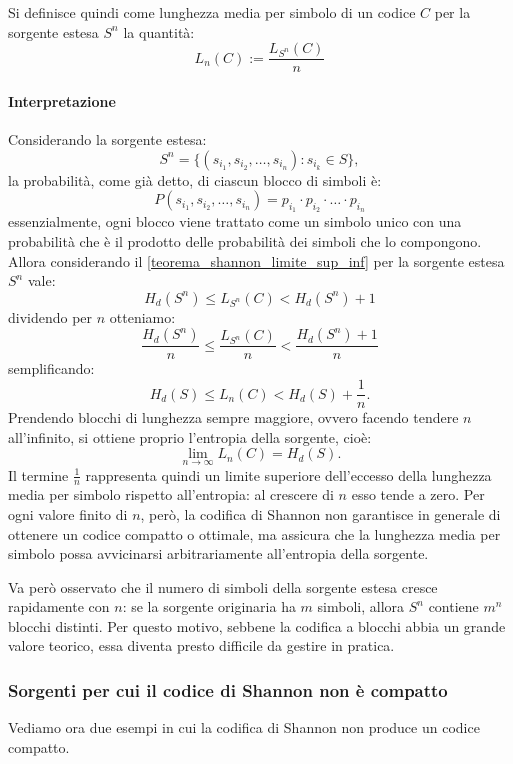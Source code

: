 \documentclass{article}
\theoremstyle{definition}
\numberwithin{equation}{section}
\begin{document}
Si definisce quindi come lunghezza media per simbolo di un codice $C$ per la sorgente estesa $S^n$ la quantità:
\[
    L_n(C) := \frac{L_{S^n}(C)}{n}
\]

\paragraph{Interpretazione}
Considerando la sorgente estesa:
\[
    S^n = \{(s_{i_1}, s_{i_2},\ldots, s_{i_n}) : s_{i_k} \in S\},
\]
la probabilità, come già detto, di ciascun blocco di simboli è:
\[
    P(s_{i_1}, s_{i_2},\ldots, s_{i_n}) = p_{i_1} \cdot p_{i_2} \cdot \ldots \cdot p_{i_n}
\]
essenzialmente, ogni blocco viene trattato come un simbolo unico con una probabilità che è il prodotto delle probabilità dei simboli che lo compongono. Allora considerando il \autoref{teorema_shannon_limite_sup_inf} per la sorgente estesa $S^n$ vale:
\[
    H_d(S^n) \leq L_{S^n}(C) < H_d(S^n) + 1
\]
dividendo per $n$ otteniamo:
\[
    \frac{H_d(S^n)}{n}  \leq \frac{L_{S^n}(C)}{n}  < \frac{H_d(S^n) + 1}{n}
\]
semplificando:
\[
    H_d(S) \leq L_n(C) < H_d(S) + \frac{1}{n}.
\]
Prendendo blocchi di lunghezza sempre maggiore, ovvero facendo tendere $n$ all'infinito, si ottiene proprio l'entropia della sorgente, cioè:
\[
    \lim_{n\to\infty} L_n(C) = H_d(S).
\]
Il termine $\frac{1}{n}$ rappresenta quindi un limite superiore dell'eccesso della lunghezza media per simbolo rispetto all'entropia: al crescere di $n$ esso tende a zero. Per ogni valore finito di $n$, però, la codifica di Shannon non garantisce in generale di ottenere un codice compatto o ottimale, ma assicura che la lunghezza media per simbolo possa avvicinarsi arbitrariamente all'entropia della sorgente.

Va però osservato che il numero di simboli della sorgente estesa cresce rapidamente con $n$: se la sorgente originaria ha $m$ simboli, allora $S^n$ contiene $m^n$ blocchi distinti. Per questo motivo, sebbene la codifica a blocchi abbia un grande valore teorico, essa diventa presto difficile da gestire in pratica.

\subsubsection{Sorgenti per cui il codice di Shannon non è compatto}
Vediamo ora due esempi in cui la codifica di Shannon non produce un codice compatto.
\end{document}
